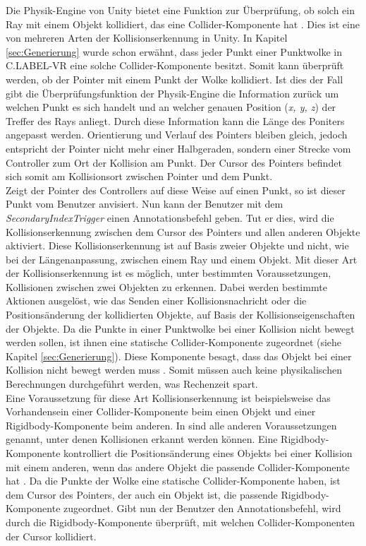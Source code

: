 Die Physik-Engine von Unity bietet eine Funktion zur Überprüfung, ob solch ein Ray mit einem Objekt kollidiert, das eine Collider-Komponente hat \cite{bib:UnityRaycast}. Dies ist eine von mehreren Arten der Kollisionserkennung in Unity. In Kapitel \ref{sec:Generierung} wurde schon erwähnt, dass jeder Punkt einer Punktwolke in C.LABEL-VR eine solche Collider-Komponente besitzt. Somit kann überprüft werden, ob der Pointer mit einem Punkt der Wolke kollidiert. Ist dies der Fall gibt die Überprüfungsfunktion der Physik-Engine die Information zurück um welchen Punkt es sich handelt und an welcher genauen Position (\textit{x, y, z}) der Treffer des Rays anliegt. Durch diese Information kann die Länge des Poniters angepasst werden. Orientierung und Verlauf des Pointers bleiben gleich, jedoch entspricht der Pointer nicht mehr einer Halbgeraden, sondern einer Strecke vom Controller zum Ort der Kollision am Punkt. Der Cursor des Pointers befindet sich somit am Kollisionsort zwischen Pointer und dem Punkt.\\

Zeigt der Pointer des Controllers auf diese Weise auf einen Punkt, so ist dieser Punkt vom Benutzer anvisiert. Nun kann der Benutzer mit dem \textit{SecondaryIndexTrigger} einen Annotationsbefehl geben. Tut er dies, wird die Kollisionserkennung zwischen dem Cursor des Pointers und allen anderen Objekte aktiviert. Diese Kollisionserkennung ist auf Basis zweier Objekte und nicht, wie bei der Längenanpassung, zwischen einem Ray und einem Objekt\cite{bib:UnityPhysics}. Mit dieser Art der Kollisionserkennung ist es möglich, unter bestimmten Voraussetzungen, Kollisionen zwischen zwei Objekten zu erkennen. Dabei werden bestimmte Aktionen ausgelöst, wie das Senden einer Kollisionsnachricht oder die Positionsänderung der kollidierten Objekte, auf Basis der Kollisionseigenschaften der Objekte. Da die Punkte in einer Punktwolke bei einer Kollision nicht bewegt werden sollen, ist ihnen eine statische Collider-Komponente zugeordnet (siehe Kapitel \ref{sec:Generierung}). Diese Komponente besagt, dass das Objekt bei einer Kollision nicht bewegt werden muss \cite{bib:Collider}. Somit müssen auch keine physikalischen Berechnungen durchgeführt werden, was Rechenzeit spart.\\

Eine Voraussetzung für diese Art Kollisionserkennung ist beispielsweise das Vorhandensein einer Collider-Komponente beim einen Objekt und einer Rigidbody-Komponente beim anderen. In \cite{bib:Collider} sind alle anderen Voraussetzungen genannt, unter denen Kollisionen erkannt werden können. Eine Rigidbody-Komponente kontrolliert die Positionsänderung eines Objekts bei einer Kollision mit einem anderen, wenn das andere Objekt die passende Collider-Komponente hat \cite{bib:UnityRigidBody}. Da die Punkte der Wolke eine statische Collider-Komponente haben, ist dem Cursor des Pointers, der auch ein Objekt ist, die passende Rigidbody-Komponente zugeordnet. Gibt nun der Benutzer den Annotationsbefehl, wird durch die Rigidbody-Komponente überprüft, mit welchen Collider-Komponenten der Cursor kollidiert.\\


